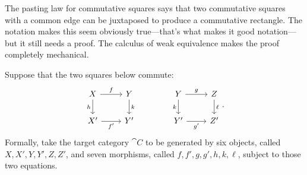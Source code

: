 \documentclass[11pt]{article}
\numberwithin{equation}{section}
\begin{document}
\begin{example}
  The pasting law for commutative squares says that two commutative squares with
  a common edge can be juxtaposed to produce a commutative rectangle. The
  notation makes this seem obviously true---that's what makes it good
  notation---but it still needs a proof. The calculus of weak equivalence makes
  the proof completely mechanical.

  Suppose that the two squares below commute:
  \begin{equation*}
    \begin{tikzcd}
      X & Y \\
      {X'} & {Y'}
      \arrow["f", from=1-1, to=1-2]
      \arrow["h"', from=1-1, to=2-1]
      \arrow["k", from=1-2, to=2-2]
      \arrow["{f'}"', from=2-1, to=2-2]
    \end{tikzcd}
    \qquad\qquad
    \begin{tikzcd}
      Y & Z \\
      {Y'} & {Z'}
      \arrow["g", from=1-1, to=1-2]
      \arrow["k"', from=1-1, to=2-1]
      \arrow["\ell", from=1-2, to=2-2]
      \arrow["{g'}"', from=2-1, to=2-2]
    \end{tikzcd}.
  \end{equation*}
  Formally, take the target category $\cat{C}$ to be generated by six objects,
  called $X,X',Y,Y',Z,Z'$, and seven morphisms, called $f,f',g,g',h,k,\ell$,
  subject to those two equations.


\end{example}
\end{document}
